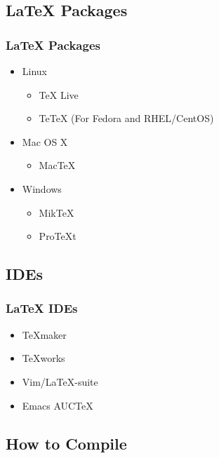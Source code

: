 
\subsection{\LaTeX{} Packages}

\begin{frame}
\frametitle{\LaTeX{} Packages}
\begin{itemize}
    \item Linux
    \begin{itemize}
        \item TeX Live
        \item TeTeX (For Fedora and RHEL/CentOS)
    \end{itemize}
    \item Mac OS X
    \begin{itemize}
        \item MacTeX
    \end{itemize}
    \item Windows
    \begin{itemize}
        \item MikTeX
        \item ProTeXt
    \end{itemize}
\end{itemize}
\end{frame}

\subsection{IDEs}

\begin{frame}
\frametitle{\LaTeX{} IDEs}
\begin{itemize}
    \item TeXmaker
    \item TeXworks
    \item Vim/LaTeX-suite
    \item Emacs AUCTeX
\end{itemize}
\end{frame}

\subsection{How to Compile}

